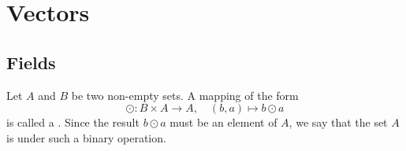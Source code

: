 \chapter{Vectors}\label{chap:vectors}

\section{Fields}

\begin{definition}
Let $ A $ and $ B $ be two non-empty sets. A mapping of the form
\begin{equation*}
    \odot:B\times A\to A,\quad(b,a)\mapsto b\odot a
\end{equation*}
is called a . Since the result $ b\odot a $ must be an element of $ A $, we say that the set $ A $ is  under such a binary operation.
\end{definition}

